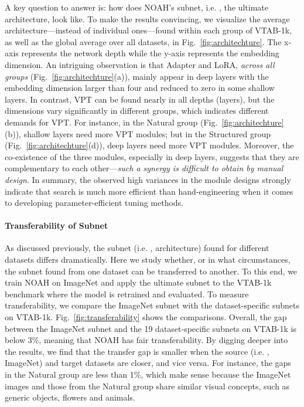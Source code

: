 A key question to answer is: how does NOAH's subnet, i.e. , the ultimate architecture, look like. To make the results convincing, we visualize the average architecture---instead of individual ones---found within each group of VTAB-1k, as well as the global average over all datasets, in Fig.~\ref{fig:architechture}. The x-axis represents the network depth while the y-axis represents the embedding dimension. An intriguing observation is that Adapter and LoRA, \emph{across all groups} (Fig.~\ref{fig:architechture}(a)), mainly appear in deep layers with the embedding dimension larger than four and reduced to zero in some shallow layers. In contrast, VPT can be found nearly in all depths (layers), but the dimensions vary significantly in different groups, which indicates different demands for VPT. For instance, in the Natural group (Fig.~\ref{fig:architechture}(b)), shallow layers need more VPT modules; but in the Structured group (Fig.~\ref{fig:architechture}(d)), deep layers need more VPT modules. Moreover, the co-existence of the three modules, especially in deep layers, suggests that they are complementary to each other---\emph{such a synergy is difficult to obtain by manual design}. In summary, the observed high variances in the module designs strongly indicate that search is much more efficient than hand-engineering when it comes to developing parameter-efficient tuning methods.

\paragraph{Transferability of Subnet} As discussed previously, the subnet (i.e. , architecture) found for different datasets differs dramatically. Here we study whether, or in what circumstances, the subnet found from one dataset can be transferred to another. To this end, we train NOAH on ImageNet and apply the ultimate subnet to the VTAB-1k benchmark where the model is retrained and evaluated. To measure transferability, we compare the ImageNet subnet with the dataset-specific subnets on VTAB-1k. Fig.~\ref{fig:transferability} shows the comparisons. Overall, the gap between the ImageNet subnet and the 19 dataset-specific subnets on VTAB-1k is below 3\%, meaning that NOAH has fair transferability. By digging deeper into the results, we find that the transfer gap is smaller when the source (i.e. , ImageNet) and target datasets are closer, and vice versa. For instance, the gaps in the Natural group are less than 1\%, which make sense because the ImageNet images and those from the Natural group share similar visual concepts, such as generic objects, flowers and animals.

